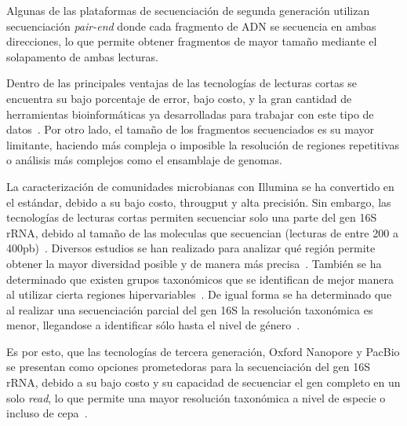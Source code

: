 Algunas de las plataformas de secuenciación de segunda generación utilizan secuenciación \textit{pair-end} donde cada fragmento de ADN se secuencia en ambas direcciones,  lo que permite obtener fragmentos de mayor tamaño mediante el solapamento de ambas lecturas. 

Dentro de las principales ventajas de las tecnologías de lecturas cortas se encuentra su bajo porcentaje de error, bajo costo, y la gran cantidad de herramientas bioinformáticas ya desarrolladas para trabajar con este tipo de datos~\cite{heather2016sequence}. Por otro lado, el tamaño de los fragmentos secuenciados es su mayor limitante, haciendo más compleja o imposible la resolución de regiones repetitivas o análisis más complejos como el ensamblaje de genomas.


La caracterización de comunidades microbianas con Illumina se ha convertido en el estándar, debido a su bajo costo, througput y alta precisión. 
Sin embargo, las tecnologías de lecturas cortas permiten secuenciar solo una parte del gen 16S rRNA, debido al tamaño de las moleculas que secuencian (lecturas de entre 200 a 400pb)~\cite{salipante2014performance}. 
Diversos estudios se han realizado para analizar qué región permite obtener la mayor diversidad posible y de manera más precisa~\cite{liu2008accurate,schloss2011reducing}. También se ha determinado que existen grupos taxonómicos que se identifican de mejor manera al utilizar cierta regiones hipervariables~\cite{he2013comparison,claesson2010comparison}. De igual forma se ha determinado que al realizar una secuenciación parcial del gen 16S la resolución taxonómica es menor, llegandose a identificar sólo hasta el nivel de género~\cite{liu2008accurate}.
 
Es por esto, que las tecnologías de tercera generación, Oxford Nanopore y PacBio se presentan como opciones prometedoras para la secuenciación del gen 16S rRNA, debido a su bajo costo y su capacidad de secuenciar el gen completo en un solo \textit{read}, lo que permite una mayor resolución taxonómica a nivel de especie o incluso de cepa~\cite{szoboszlay2023nanopore,10.1186/s13742}.%




